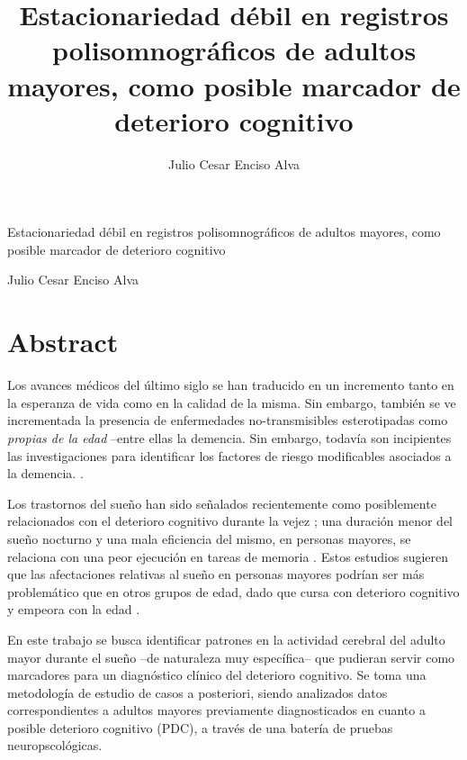 \documentclass[12pt,a4paper]{mitthesis}
\begin{document}

\title{Estacionariedad d\'ebil en registros polisomnogr\'aficos de adultos mayores,
como posible marcador de deterioro cognitivo}
%
\author{Julio Cesar Enciso Alva}

\begin{center}
\huge{Estacionariedad d\'ebil en registros polisomnogr\'aficos de adultos mayores,
como posible marcador de deterioro cognitivo}


\Large{Julio Cesar Enciso Alva}
\end{center}

\newpage


\chapter*{Abstract}

Los avances m\'edicos del \'ultimo siglo se han traducido en un incremento tanto en la esperanza
de vida como en la calidad de la misma. Sin embargo, tambi\'en se ve incrementada la presencia
de enfermedades no-transmisibles esterotipadas como \textit{propias de la edad} --entre ellas la 
demencia.
Sin embargo, todav\'ia son incipientes las investigaciones para identificar los factores de riesgo 
modificables asociados a la demencia. \cite{PlanAlzheimer04}.

Los trastornos del sue\~no han sido se\~nalados recientemente como posiblemente relacionados con el 
deterioro cognitivo durante la vejez \cite{Amer13,Miyata13,Potvin12}; una duraci\'on menor del 
sue\~no nocturno y una mala eficiencia del mismo, en personas mayores, se relaciona con una peor 
ejecuci\'on en tareas de memoria \cite{Reid06}. Estos estudios sugieren que las afectaciones
relativas al sue\~no en personas mayores podr\'ian ser m\'as problem\'atico que en otros grupos de 
edad, dado que cursa con deterioro cognitivo y empeora con la edad \cite{Potvin12}.

En este trabajo se busca identificar patrones en la actividad cerebral del adulto
mayor durante el sue\~no
--de naturaleza muy espec\'ifica-- 
que pudieran servir como marcadores para un diagn\'ostico cl\'inico del deterioro cognitivo.
Se toma una metodolog\'ia de estudio de casos a posteriori, siendo analizados datos 
correspondientes a adultos mayores previamente diagnosticados en cuanto a 
posible deterioro cognitivo (PDC), a trav\'es de una bater\'ia de pruebas neuropscol\'ogicas.
\end{document}
